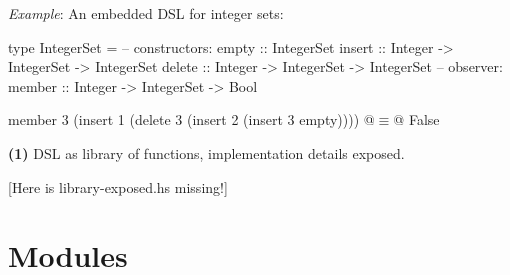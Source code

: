 \textit{Example}: An embedded DSL for integer sets:
\begin{codebox}[haskell]
type IntegerSet = 
    -- constructors:
    empty :: IntegerSet
    insert :: Integer -> IntegerSet -> IntegerSet
    delete :: Integer -> IntegerSet -> IntegerSet
    -- observer:
    member :: Integer -> IntegerSet -> Bool

member 3 (insert 1 (delete 3 (insert 2 (insert 3 empty))))
    @$\equiv$@ False
\end{codebox}

\vspace{2cm}

\textbf{(1)}
DSL as library of functions, implementation details exposed. 

\vspace{9pt}
\textcolor{myorange}{[Here is library-exposed.hs missing!]}
\vspace{9pt}



\section{Modules}


